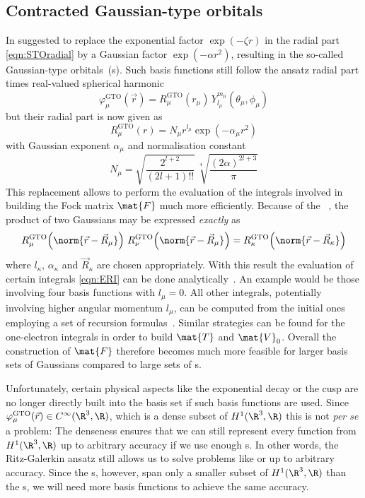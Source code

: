 \subsection{Contracted Gaussian-type orbitals}
\label{sec:cGTO}

In \citeyear{Boys1950} \citeauthor{Boys1950} \cite{Boys1950} suggested to replace
the exponential factor $\exp(- \zeta r)$ in the radial part \eqref{eqn:STOradial}
by a Gaussian factor $\exp(-\alpha r^2)$,
resulting in the so-called Gaussian-type orbitals~({\GTO}s).
Such \GTO basis functions still follow the ansatz radial part times real-valued spherical harmonic
\begin{equation}
	\varphi^\text{GTO}_\mu(\vec{r}) =
	R^\text{GTO}_\mu(r_\mu) \, Y_{l_\mu}^{m_\mu}(\theta_\mu, \phi_\mu)
	\label{eqn:ACproductCgto}
\end{equation}
but their radial part is now given as
\begin{equation}
	R^\text{GTO}_\mu(r) = N_\mu r^{l_\mu} \exp(-\alpha_\mu r^2)
	\label{eqn:GTOradial}
\end{equation}
with Gaussian exponent $\alpha_\mu$ and normalisation constant
\[
	N_\mu =  \sqrt{\frac{2^{l+2}}{(2l+1)!!}} \, \sqrt[4]{\frac{(2\alpha)^{2l+3}}{\pi}}
\]
This replacement allows to perform the
evaluation of the integrals involved in building the Fock matrix $\mat{F}$
much more efficiently.
Because of the %
~\cite{Boys1950,Szabo1996,Besalu2011},
the product of two Gaussians may be expressed \emph{exactly} as
\[
	R^\text{GTO}_\mu\!\left( \norm{\vec{r} - \vec{R}_\mu}\right)
	\,
	R^\text{GTO}_\nu\!\left( \norm{\vec{r} - \vec{R}_\mu}\right)
	= R^\text{GTO}_\kappa\!\left( \norm{\vec{r} - \vec{R}_\kappa}\right)
\]
where $l_\kappa$, $\alpha_\kappa$ and $\vec{R}_\kappa$ are chosen appropriately.
With this result the evaluation of certain \ERI integrals \eqref{eqn:ERI}
can be done analytically~\cite{Boys1950}.
An example would be those involving four basis functions with $l_\mu = 0$.
All other \ERI integrals, potentially involving higher angular momentum $l_\mu$,
can be computed from the initial ones employing
a set of recursion formulas~\cite{Gill1994}.
Similar strategies can be found for the one-electron integrals
in order to build $\mat{T}$ and $\mat{V}_0$.
Overall the construction of $\mat{F}$ therefore becomes much more
feasible for larger basis sets of Gaussians compared to large sets of {\STO}s.

Unfortunately, certain physical aspects like the exponential decay
or the cusp are no longer directly built into the basis set
if such \GTO basis functions are used.
Since $\varphi^\text{GTO}_\mu(\vec{r}) \in C^\infty(\R^3, \R)$,
which is a dense subset of $H^1(\R^3, \R)$
this is not \textit{per se} a problem:
The denseness ensures that we can still represent every function
from $H^1(\R^3, \R)$ up to arbitrary accuracy if we use enough {\GTO}s.
In other words, the Ritz-Galerkin ansatz still allows us to
solve problems like \HF or \FCI up to arbitrary accuracy.
Since the {\GTO}s, however,
span only a smaller subset of $H^1(\R^3, \R)$ than the {\STO}s,
we will need more \GTO basis functions to achieve the same accuracy.

